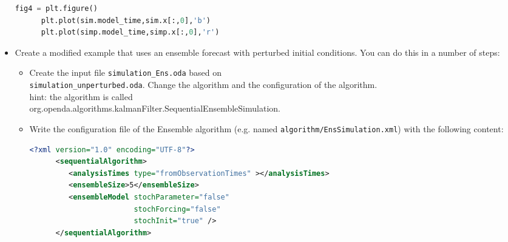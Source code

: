 \documentclass[a4paper,10pt]{article}
\begin{document}
\begin{itemize}
\begin{lstlisting}[language=Python,frame=single,caption={Python}]
      fig4 = plt.figure()
      plt.plot(sim.model_time,sim.x[:,0],'b')
      plt.plot(simp.model_time,simp.x[:,0],'r')
      \end{lstlisting}

\item Create a modified example that uses an ensemble forecast with perturbed
      initial conditions. You can do this in a number of steps:
      \begin{itemize}
      \item Create the input file {\tt simulation\_Ens.oda} based on\\
            {\tt simulation\_unperturbed.oda}. Change the algorithm and the
            configuration of the algorithm.\\
            hint: the algorithm is called \\
            org.openda.algorithms.kalmanFilter.SequentialEnsembleSimulation.
      \item Write the configuration file of the Ensemble algorithm (e.g. named
            {\tt algorithm/EnsSimulation.xml}) with the following content:
      \begin{lstlisting}[language=XML,frame=single,caption={XML-input for sequentialAlgorithm}]
      <?xml version="1.0" encoding="UTF-8"?>
      <sequentialAlgorithm>
         <analysisTimes type="fromObservationTimes" ></analysisTimes>
         <ensembleSize>5</ensembleSize>
         <ensembleModel stochParameter="false"
                        stochForcing="false"
                        stochInit="true" />
      </sequentialAlgorithm>
      \end{lstlisting}
      \end{itemize}
      

\end{itemize}
\end{document}
